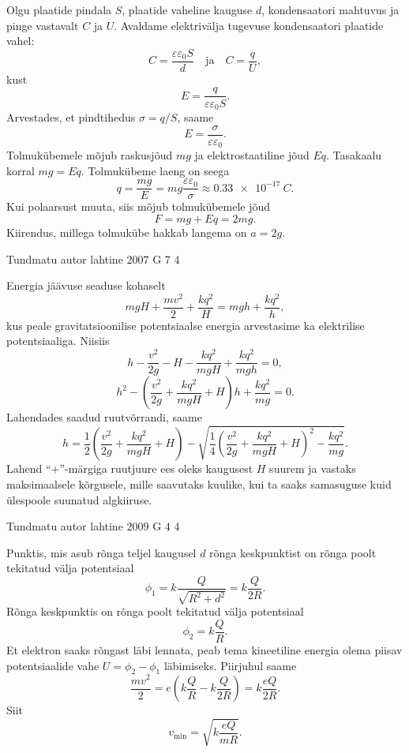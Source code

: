 \documentclass[11pt]{article}
\begin{document}
{{\ifSolution
Olgu plaatide pindala $S$, plaatide vaheline kauguse $d$, kondensaatori mahtuvus ja pinge vastavalt $C$ ja $U$. Avaldame elektrivälja tugevuse kondensaatori plaatide vahel:
\[
C=\frac{\varepsilon \varepsilon_{0} S}{d} \quad \text{ja} \quad C=\frac{q}{U},
\]
kust
\[
E=\frac{q}{\varepsilon \varepsilon_{0} S}.
\]
Arvestades, et pindtihedus $\sigma = q/S$, saame
\[
E = \frac{\sigma}{\varepsilon\varepsilon_0}.
\]
Tolmukübemele mõjub raskusjõud $mg$ ja elektrostaatiline jõud $Eq$. Tasakaalu korral $mg = Eq$. Tolmukübeme laeng on seega
\[
q=\frac{m g}{E}=m g \frac{\varepsilon \varepsilon_{0}}{\sigma} \approx \SI{0,33e-17}{C}.
\]
Kui polaarsust muuta, siis mõjub tolmukübemele jõud
\[
F = mg + Eq = 2mg.
\]
Kiirendus, millega tolmukübe hakkab langema on $a = 2g$.
\fi
}

{Tundmatu autor} %
{lahtine} %
{2007} %
{G 7} %
{4} %
{

\ifSolution
Energia jäävuse seaduse kohaselt
\[
mgH + \frac{mv^2}{2} + \frac{kq^2}{H} = mgh + \frac{kq^2}{h},
\]
kus peale gravitatsioonilise potentsiaalse energia arvestasime ka elektrilise potentsiaaliga. Niisiis
\[
h-\frac{v^{2}}{2 g}-H-\frac{k q^{2}}{m g H}+\frac{k q^{2}}{m g h}=0,
\]
\[
h^{2}-\left(\frac{v^{2}}{2 g}+\frac{k q^{2}}{m g H}+H\right) h+\frac{k q^{2}}{m g}=0.
\]
Lahendades saadud ruutvõrrandi, saame
\[
h=\frac{1}{2}\left(\frac{v^{2}}{2 g}+\frac{k q^{2}}{m g H}+H\right)-\sqrt{\frac{1}{4}\left(\frac{v^{2}}{2 g}+\frac{k q^{2}}{m g H}+H\right)^{2}-\frac{k q^{2}}{m g}}.
\]
Lahend \enquote{$+$}-märgiga ruutjuure ees oleks kaugusest $H$ suurem ja vastaks maksimaalsele kõrgusele, mille saavutaks kuulike, kui ta saaks samasuguse kuid ülespoole suunatud algkiiruse.
\fi
}

{Tundmatu autor} %
{lahtine} %
{2009} %
{G 4} %
{4} %
{

\ifSolution
Punktis, mis asub rõnga teljel kaugusel $d$ rõnga keskpunktist on rõnga poolt tekitatud välja potentsiaal
\[
\phi_{1}=k \frac{Q}{\sqrt{R^{2}+d^{2}}}=k \frac{Q}{2 R}.
\]
Rõnga keskpunktis on rõnga poolt tekitatud välja potentsiaal
\[
\phi_{2}=k \frac{Q}{R}.
\]
Et elektron saaks rõngast läbi lennata, peab tema kineetiline energia olema piisav
potentsiaalide vahe $U = \phi_2 - \phi_1$ läbimiseks. Piirjuhul saame
\[
\frac{m v^{2}}{2}=e\left(k \frac{Q}{R}-k \frac{Q}{2 R}\right)=k \frac{e Q}{2 R}.
\]
Siit
\[
v_{\min }=\sqrt{k \frac{e Q}{m R}}.
\]
\fi
}

}
\end{document}
